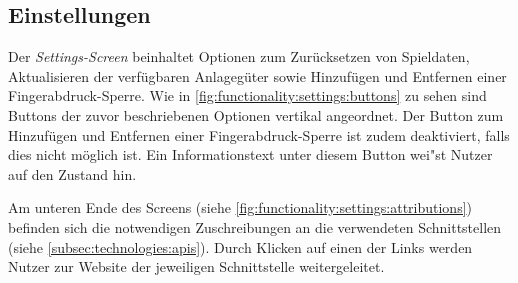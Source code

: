 \documentclass[a4paper]{article}
\begin{document}
\subsection{Einstellungen}
\label{subsec:functionality:settings}
Der \textit{Settings-Screen} beinhaltet Optionen zum Zurücksetzen von Spieldaten, Aktualisieren der verfügbaren Anlagegüter sowie Hinzufügen und Entfernen einer Fingerabdruck-Sperre.
Wie in \autoref{fig:functionality:settings:buttons} zu sehen sind Buttons der zuvor beschriebenen Optionen vertikal angeordnet.
Der Button zum Hinzufügen und Entfernen einer Fingerabdruck-Sperre ist zudem deaktiviert, falls dies nicht möglich ist.
Ein Informationstext unter diesem Button wei"st Nutzer auf den Zustand hin.

Am unteren Ende des Screens (siehe \autoref{fig:functionality:settings:attributions}) befinden sich die notwendigen Zuschreibungen an die verwendeten Schnittstellen (siehe \autoref{subsec:technologies:apis}).
Durch Klicken auf einen der Links werden Nutzer zur Website der jeweiligen Schnittstelle weitergeleitet.

\end{document}
